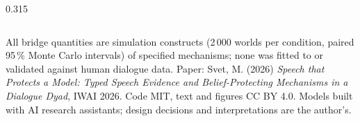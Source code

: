 \documentclass[final,t]{beamer}
\begin{document}
\begin{frame}[t]
\begin{columns}[t,totalwidth=0.965\paperwidth]
\begin{column}{0.315\textwidth}
\end{column}
\end{columns}
\vfill
\begin{columns}[t,totalwidth=0.965\paperwidth]\begin{column}{\textwidth}
{\small\color{meta} All bridge quantities are simulation constructs (2\,000 worlds per condition, paired 95\,\% Monte Carlo intervals) of specified mechanisms; none was fitted to or validated against human dialogue data. Paper: Svet, M. (2026) \emph{Speech that Protects a Model: Typed Speech Evidence and Belief-Protecting Mechanisms in a Dialogue Dyad}, IWAI 2026. Code MIT, text and figures CC BY 4.0. Models built with AI research assistants; design decisions and interpretations are the author's.}
\end{column}\end{columns}
\end{frame}
\end{document}
